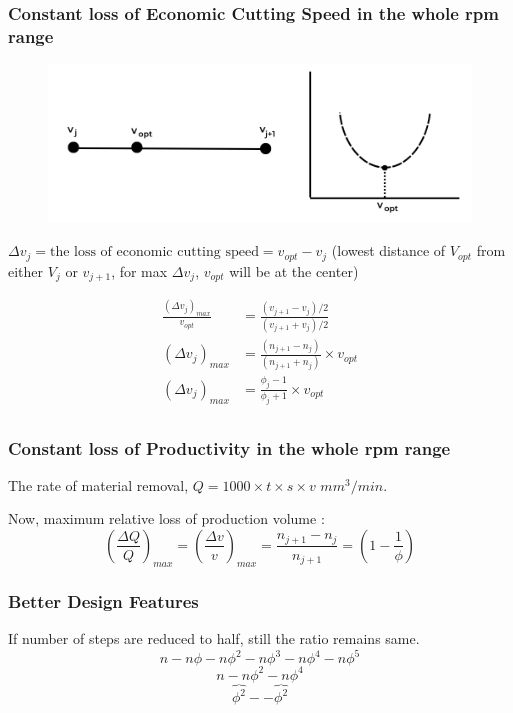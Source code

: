 \documentclass{article}
\begin{document}
\subsubsection*{Constant loss of Economic Cutting Speed in the whole rpm range}
\begin{figure}[h]
  \begin{center}
    \includegraphics*[width=0.95\linewidth]{img/kinematic_advantage.png}
  \end{center}
\end{figure}

$\Delta v_j = \text{the loss of economic cutting speed} = v_{opt} - v_j$
 (lowest distance of $V_{opt}$ from either $V_j$ or $v_{j+1}$, for max $\Delta v_j$, $v_{opt}$ will be at the center)

 \begin{align*}
  \frac{\left(\Delta v_j\right)_{max}}{v_{opt}} &= \frac{\left(v_{j+1} - v_j\right)/2}{\left(v_{j+1} + v_j\right)/2} \\
  \left(\Delta v_j\right)_{max} &= \frac{\left(n_{j+1} - n_j\right)}{\left(n_{j+1} + n_j\right)} \times v_{opt} \\
  \left(\Delta v_j\right)_{max} &= \frac{\phi_{j} - 1}{\phi_{j} + 1} \times v_{opt} \\
 \end{align*}

 \subsubsection*{Constant loss of Productivity in the whole rpm range}
 The rate of material removal, $Q = 1000 \times t  \times s \times v $  $mm^3/min$. 

Now, maximum relative loss of production volume : 
$$\left(\frac{\Delta Q}{Q}\right)_{max} = \left(\frac{\Delta v}{v}\right)_{max} = \frac{n_{j+1} - n_j}{n_{j+1} } = \left(1 - \frac{1}{\phi}\right) $$ 

\subsubsection*{Better Design Features}
If number of steps are reduced to half, still the ratio remains same. 
$$n - n\phi - n\phi^2 - n\phi^3 - n\phi^4 - n\phi^5$$
$$n  - n\phi^2 - n\phi^4 $$
$$\overbrace{\phi^2} -- \overbrace{\phi^2} $$
\end{document}
